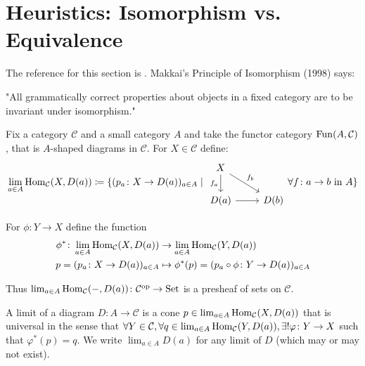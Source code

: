 \section{Heuristics: Isomorphism vs. Equivalence}

The reference for this section is \cite[ch.4,5,6]{leinster2014basic}.
\newline
Makkai's Principle of Isomorphism (1998) says:

"All grammatically correct properties about objects in a fixed category are to be invariant under isomorphism."

Fix a category $ \mathcal{ C } $ and a small category $ A $ and take the functor category $ \operatorname{Fun} ( A , \mathcal{ C } )$, that is $ A $-shaped diagrams in $ \mathcal{ C } $.
For $ X \in \mathcal{ C } $ define:
\[
    \lim_{a \in A} \Hom_{\mathcal{ C }} ( X , D(a)) \coloneqq \{ ( p_a \colon X \to  D ( a ) )_{ a \in A } \mid 
    \begin{tikzcd}
    X
    \ar[d, "f_a"']
    \ar[rd, "f_b"]
    \\
    D ( a ) 
    \ar[r]
    &
    D ( b ) 
    \end{tikzcd}
    \forall f \colon a \to b \text{ in } A
    \}
\]

For $ \phi \colon Y \to X $ define the function 
\begin{align*}
    \phi^* \colon \lim_{a \in A} \operatorname{Hom}_{ \mathcal{ C }} ( X , D ( a ) ) 
    &\to
    \lim_{ a \in A } \operatorname{Hom}_{ \mathcal{ C }} ( Y , D ( a ) ) 
    \\
    p = ( p_a \colon X \to D ( a ) )_{ a \in A }
    &\mapsto
    \phi^* ( p ) = ( p_a \circ \phi \colon Y \to D ( a ) )_{ a \in A }
\end{align*}

Thus $ \lim_{a \in A } \operatorname{Hom}_{ \mathcal{ C } } ( - , D ( a ) ) \colon \mathcal{ C }^{\operatorname{op}} \to \operatorname{Set} $ is a presheaf of sets on $ \mathcal{ C } $.

\begin{defi}
    A limit of a diagram $ D \colon A \to \mathcal{ C } $ is a cone $ p \in \lim_{a \in A } \operatorname{Hom}_{ \mathcal{ C } } ( X, D ( a ) ) $ that is universal in the sense that $ \forall Y \in \mathcal{ C } , \forall q \in \lim_{a \in A} \operatorname{Hom}_{\mathcal{ C }} ( Y , D ( a ) ) , \exists! \varphi \colon Y \to X $ such that $ \varphi^* ( p ) = q $.
    We write $ \lim_{ a \in A } D ( a ) $ for any limit of $ D $ (which may or may not exist).
\end{defi}

